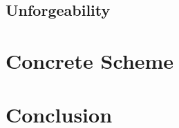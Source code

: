 \documentclass[usenames,dvipsnames]{beamer}
\begin{document}
  \subsection{Unforgeability}
  

\section{Concrete Scheme}










\section{Conclusion}

\end{document}
